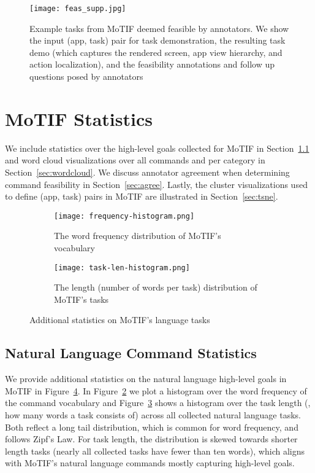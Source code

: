 \begin{figure}[t]
    \centering

    \texttt{[image: feas\_supp.jpg]}
            \caption{Example tasks from MoTIF deemed feasible by annotators. We show the input (app, task) pair for task demonstration, the resulting task demo (which captures the rendered screen, app view hierarchy, and action localization), and the feasibility annotations and follow up questions posed by annotators}
    \label{fig:feas_motif_ex}
\end{figure}

\clearpage

\section{MoTIF Statistics}
We include statistics over the high-level goals collected for MoTIF in Section~\ref{sec:nl_stats} and word cloud visualizations over all commands and per category in Section~\ref{sec:wordcloud}. We discuss annotator agreement when determining command feasibility in Section~\ref{sec:agree}. Lastly, the cluster visualizations used to define (app, task) pairs in MoTIF are illustrated in Section~\ref{sec:tsne}.

\label{sec:stats}
\begin{figure}[t]
\centering
\begin{subfigure}{0.48\textwidth}
  \centering
  \texttt{[image: frequency-histogram.png]}
  \caption{The word frequency distribution of MoTIF's vocabulary}
  \label{fig:wordfreq}
\end{subfigure}
\begin{subfigure}{0.48\textwidth}
  \centering
  \texttt{[image: task-len-histogram.png]}
  \caption{The length (number of words per task) distribution of MoTIF's tasks}
  \label{fig:tasklen}
\end{subfigure}
\caption{Additional statistics on MoTIF's language tasks}
\label{fig:langanalysis}
\end{figure}

\subsection{Natural Language Command Statistics}
\label{sec:nl_stats}
We provide additional statistics on the natural language high-level goals in MoTIF in Figure~\ref{fig:langanalysis}. In Figure~\ref{fig:wordfreq} we plot a histogram over the word frequency of the command vocabulary and Figure~\ref{fig:tasklen} shows a histogram over the task length (\ie, how many words a task consists of) across all collected natural language tasks. Both reflect a long tail distribution, which is common for word frequency, and follows Zipf's Law. For task length, the distribution is skewed towards shorter length tasks (nearly all collected tasks have fewer than ten words), which aligns with MoTIF's natural language commands mostly capturing high-level goals.
